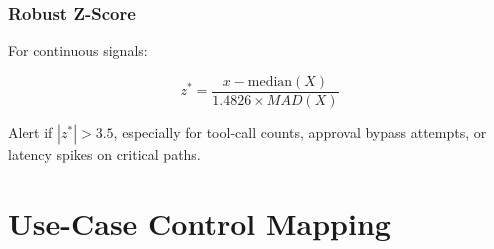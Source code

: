 \documentclass[11pt,a4paper]{article}
\begin{document}
\subsubsection{Robust Z-Score}

For continuous signals:

\begin{equation}
z^\ast = \frac{x - \text{median}(X)}{1.4826 \times MAD(X)}
\end{equation}

Alert if \(|z^\ast| > 3.5\), especially for tool-call counts, approval bypass attempts, or latency spikes on critical paths.

\section{Use-Case Control Mapping}
\end{document}
